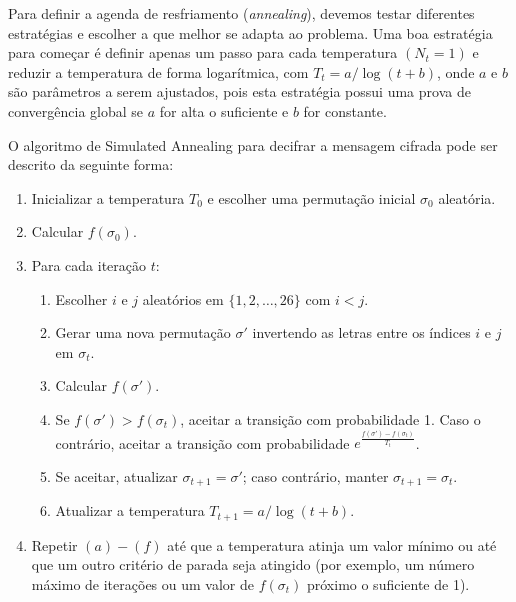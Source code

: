 \begin{resposta}
    Para definir a agenda de resfriamento (\textit{annealing}), devemos testar diferentes estratégias e escolher a que melhor se adapta ao problema. Uma boa estratégia para começar é definir apenas um passo para cada temperatura $(N_t=1)$ e reduzir a temperatura de forma logarítmica, com $T_t = a / \log(t+b)$, onde $a$ e $b$ são parâmetros a serem ajustados, pois esta estratégia possui uma prova de convergência global se $a$ for alta o suficiente e $b$ for constante.

    O algoritmo de Simulated Annealing para decifrar a mensagem cifrada pode ser descrito da seguinte forma:
    \begin{enumerate}
        \item Inicializar a temperatura $T_0$ e escolher uma permutação inicial $\sigma_0$ aleatória.
        \item Calcular $f(\sigma_0)$.
        \item Para cada iteração $t$:
            \begin{enumerate}
                \item Escolher $i$ e $j$ aleatórios em $\{1, 2, \ldots, 26\}$ com $i<j$.
                \item Gerar uma nova permutação $\sigma'$ invertendo as letras entre os índices $i$ e $j$ em $\sigma_t$.
                \item Calcular $f(\sigma')$.
                \item Se $f(\sigma') > f(\sigma_t)$, aceitar a transição com probabilidade 1. Caso o contrário, aceitar a transição com probabilidade $e^{\frac{f(\sigma')-f(\sigma_t)}{T_t}}$.
                \item Se aceitar, atualizar $\sigma_{t+1} = \sigma'$; caso contrário, manter $\sigma_{t+1} = \sigma_t$.
                \item Atualizar a temperatura $T_{t+1} = a / \log(t+b)$.
            \end{enumerate}
        \item Repetir $(a)-(f)$ até que a temperatura atinja um valor mínimo ou até que um outro critério de parada seja atingido (por exemplo, um número máximo de iterações ou um valor de $f(\sigma_t)$ próximo o suficiente de 1).
    \end{enumerate}
\end{resposta}
